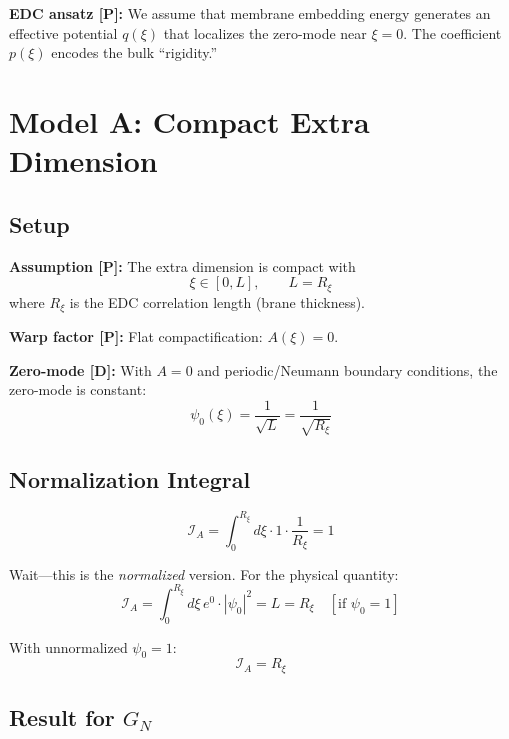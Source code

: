 \documentclass[11pt,a4paper]{article}
\newcommand{\GN}{G_N}
\newcommand{\calI}{\mathcal{I}}
\newcommand{\Rxi}{R_\xi}
\begin{document}
\textbf{EDC ansatz [P]:} We assume that membrane embedding energy generates
an effective potential $q(\xi)$ that localizes the zero-mode near $\xi = 0$.
The coefficient $p(\xi)$ encodes the bulk ``rigidity.''

\section{Model A: Compact Extra Dimension}
\label{sec:model-a}

\subsection{Setup}

\textbf{Assumption [P]:} The extra dimension is compact with
\begin{equation}
\xi \in [0, L], \qquad L = \Rxi
\end{equation}
where $\Rxi$ is the EDC correlation length (brane thickness).

\textbf{Warp factor [P]:} Flat compactification: $A(\xi) = 0$.

\textbf{Zero-mode [D]:} With $A = 0$ and periodic/Neumann boundary conditions,
the zero-mode is constant:
\begin{equation}
\psi_0(\xi) = \frac{1}{\sqrt{L}} = \frac{1}{\sqrt{\Rxi}}
\end{equation}

\subsection{Normalization Integral}

\begin{equation}
\label{eq:model-a-I}
\calI_A = \int_0^{\Rxi} d\xi \cdot 1 \cdot \frac{1}{\Rxi} = 1
\end{equation}

Wait---this is the \emph{normalized} version. For the physical quantity:
\begin{equation}
\calI_A = \int_0^{\Rxi} d\xi\, e^{0} \cdot |\psi_0|^2 = L = \Rxi
\quad [\text{if } \psi_0 = 1]
\end{equation}

With unnormalized $\psi_0 = 1$:
\begin{equation}
\boxed{\calI_A = \Rxi}
\end{equation}

\subsection{Result for $\GN$}
\end{document}
